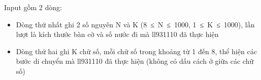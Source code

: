 Input gồm 2 dòng:
\begin{itemize}
	\item Dòng thứ nhất ghi 2 số nguyên N và K (8 ≤ N ≤ 1000, 1 ≤ K ≤ 1000), lần lượt là kích thước bàn cờ và số nước đi mà ll931110 đã thực hiện
	\item Dòng thứ hai ghi K chữ số, mỗi chữ số trong khoảng từ 1 đến 8, thể hiện các bước di chuyển mà ll931110 đã thực hiện (không có dấu cách ở giữa các chữ số)
\end{itemize}